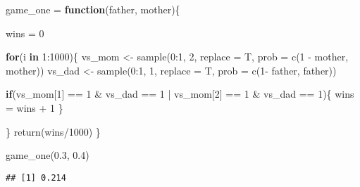 \documentclass[
]{article}
\newenvironment{Shaded}{\begin{snugshade}}{\end{snugshade}}
\newcommand{\AttributeTok}[1]{\textcolor[rgb]{0.77,0.63,0.00}{#1}}
\newcommand{\ControlFlowTok}[1]{\textcolor[rgb]{0.13,0.29,0.53}{\textbf{#1}}}
\newcommand{\DecValTok}[1]{\textcolor[rgb]{0.00,0.00,0.81}{#1}}
\newcommand{\FloatTok}[1]{\textcolor[rgb]{0.00,0.00,0.81}{#1}}
\newcommand{\FunctionTok}[1]{\textcolor[rgb]{0.00,0.00,0.00}{#1}}
\newcommand{\NormalTok}[1]{#1}
\newcommand{\OtherTok}[1]{\textcolor[rgb]{0.56,0.35,0.01}{#1}}
\newcommand{\SpecialCharTok}[1]{\textcolor[rgb]{0.00,0.00,0.00}{#1}}
\begin{document}
\begin{Shaded}
\begin{Highlighting}[]
\NormalTok{game\_one }\OtherTok{=} \ControlFlowTok{function}\NormalTok{(father, mother)\{}
  
\NormalTok{  wins }\OtherTok{=} \DecValTok{0}
  
  \ControlFlowTok{for}\NormalTok{(i }\ControlFlowTok{in} \DecValTok{1}\SpecialCharTok{:}\DecValTok{1000}\NormalTok{)\{}
\NormalTok{      vs\_mom }\OtherTok{\textless{}{-}} \FunctionTok{sample}\NormalTok{(}\DecValTok{0}\SpecialCharTok{:}\DecValTok{1}\NormalTok{, }\DecValTok{2}\NormalTok{, }\AttributeTok{replace =}\NormalTok{ T, }\AttributeTok{prob =} \FunctionTok{c}\NormalTok{(}\DecValTok{1} \SpecialCharTok{{-}}\NormalTok{ mother, mother))}
\NormalTok{      vs\_dad }\OtherTok{\textless{}{-}} \FunctionTok{sample}\NormalTok{(}\DecValTok{0}\SpecialCharTok{:}\DecValTok{1}\NormalTok{, }\DecValTok{1}\NormalTok{, }\AttributeTok{replace =}\NormalTok{ T, }\AttributeTok{prob =} \FunctionTok{c}\NormalTok{(}\DecValTok{1}\SpecialCharTok{{-}}\NormalTok{ father, father))}
  
      \ControlFlowTok{if}\NormalTok{(vs\_mom[}\DecValTok{1}\NormalTok{] }\SpecialCharTok{==} \DecValTok{1} \SpecialCharTok{\&}\NormalTok{ vs\_dad }\SpecialCharTok{==} \DecValTok{1} \SpecialCharTok{|}\NormalTok{ vs\_mom[}\DecValTok{2}\NormalTok{] }\SpecialCharTok{==} \DecValTok{1} \SpecialCharTok{\&}\NormalTok{ vs\_dad }\SpecialCharTok{==} \DecValTok{1}\NormalTok{)\{}
\NormalTok{        wins }\OtherTok{=}\NormalTok{ wins }\SpecialCharTok{+} \DecValTok{1}
\NormalTok{      \}}
      
\NormalTok{  \}}
  \FunctionTok{return}\NormalTok{(wins}\SpecialCharTok{/}\DecValTok{1000}\NormalTok{)}
\NormalTok{\}}

\FunctionTok{game\_one}\NormalTok{(}\FloatTok{0.3}\NormalTok{, }\FloatTok{0.4}\NormalTok{)}
\end{Highlighting}
\end{Shaded}

\begin{verbatim}
## [1] 0.214
\end{verbatim}
\end{document}
